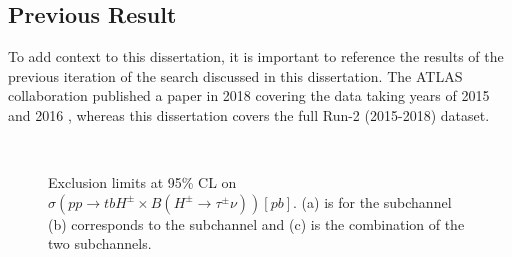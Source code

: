 	\subsection{Previous Result}\label{ssec:Prev Hpm}
		To add context to this dissertation, it is important to reference the results of the previous iteration of the search discussed in this dissertation. The \gls{ATLAS} collaboration published a paper in 2018 covering the data taking years of 2015 and 2016 \cite{hpm-previous}, whereas this dissertation covers the full Run-2 (2015-2018) dataset. 
		\begin{figure}[!ht]
			\centering
			 \\
			\caption{\label{fig:hpm-prev-limits} Exclusion limits at 95\% CL on $\sigma(pp \to tbH^{\pm} \times B(H^{\pm} \to \tau^\pm \nu)) [pb]$. (a) is for the \taujets subchannel (b) corresponds to the \taulep subchannel and (c) is the combination of the two subchannels. \cite{hpm-previous} }
		\end{figure}
